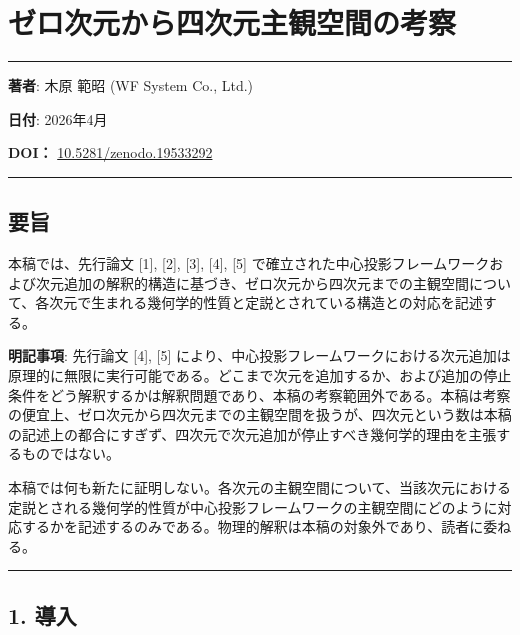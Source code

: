 \documentclass[a4paper,11pt]{ltjsarticle}
\theoremstyle{definition}
\begin{document}
\section{ゼロ次元から四次元主観空間の考察}\label{ux30bcux30edux6b21ux5143ux304bux3089ux56dbux6b21ux5143ux4e3bux89b3ux7a7aux9593ux306eux8003ux5bdf}

\begin{center}\rule{0.5\linewidth}{0.5pt}\end{center}

\textbf{著者}: 木原 範昭 (WF System Co., Ltd.)

\textbf{日付}: 2026年4月

\textbf{DOI：} \href{https://doi.org/10.5281/zenodo.19533292}{10.5281/zenodo.19533292}

\begin{center}\rule{0.5\linewidth}{0.5pt}\end{center}

\subsection{要旨}\label{ux8981ux65e8}

本稿では、先行論文 {[}1{]}, {[}2{]}, {[}3{]}, {[}4{]}, {[}5{]} で確立された中心投影フレームワークおよび次元追加の解釈的構造に基づき、ゼロ次元から四次元までの主観空間について、各次元で生まれる幾何学的性質と定説とされている構造との対応を記述する。

\textbf{明記事項}: 先行論文 {[}4{]}, {[}5{]} により、中心投影フレームワークにおける次元追加は原理的に無限に実行可能である。どこまで次元を追加するか、および追加の停止条件をどう解釈するかは解釈問題であり、本稿の考察範囲外である。本稿は考察の便宜上、ゼロ次元から四次元までの主観空間を扱うが、四次元という数は本稿の記述上の都合にすぎず、四次元で次元追加が停止すべき幾何学的理由を主張するものではない。

本稿では何も新たに証明しない。各次元の主観空間について、当該次元における定説とされる幾何学的性質が中心投影フレームワークの主観空間にどのように対応するかを記述するのみである。物理的解釈は本稿の対象外であり、読者に委ねる。

\begin{center}\rule{0.5\linewidth}{0.5pt}\end{center}

\subsection{1. 導入}\label{ux5c0eux5165}
\end{document}
